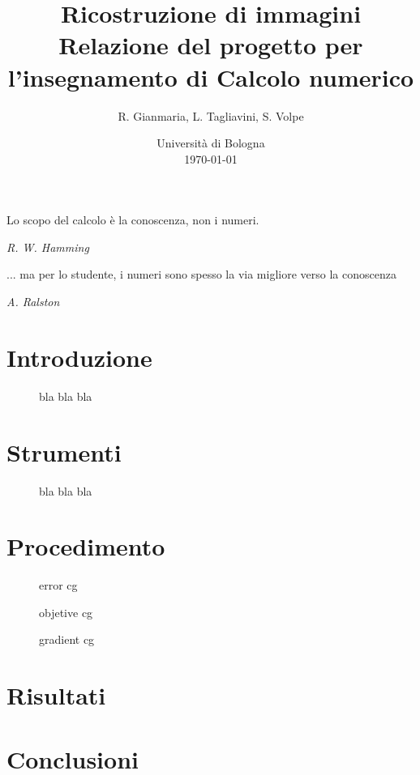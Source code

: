 \documentclass[a4paper]{article}
\title{Ricostruzione di immagini \\ \large Relazione del progetto per l'insegnamento di Calcolo numerico}
\author{
  R. Gianmaria,
  L. Tagliavini,
  S. Volpe
}
\date{
	Universit\`a di Bologna \\
  \today
}
\begin{document}
\maketitle
\thispagestyle{empty}

\epigraph{Lo scopo del calcolo è la conoscenza, non i numeri.}
{\textit{R. W. Hamming}}
\epigraph{... ma per lo studente, i numeri sono spesso la via migliore verso la
conoscenza}
{\textit{A. Ralston}}

\section{Introduzione}

\begin{figure}
    \begin{center}
        \scalebox{0.65}{}
    \end{center}
    \caption{bla bla bla}
\end{figure}

\section{Strumenti}

\begin{figure}
    \begin{center}
        \scalebox{0.65}{}
    \end{center}
    \begin{center}
        \scalebox{0.65}{}
    \end{center}
    \begin{center}
      \scalebox{0.65}{}
    \end{center}
    \caption{bla bla bla}
\end{figure}

\section{Procedimento}

\begin{figure}
    \begin{center}
        \scalebox{0.65}{}
    \end{center}
    \caption{error cg}
\end{figure}

\begin{figure}
    \begin{center}
        \scalebox{0.65}{}
    \end{center}
    \caption{objetive cg}
\end{figure}

\begin{figure}
    \begin{center}
        \scalebox{0.65}{}
    \end{center}
    \caption{gradient cg}
\end{figure}

\section{Risultati}

\section{Conclusioni}
\end{document}
